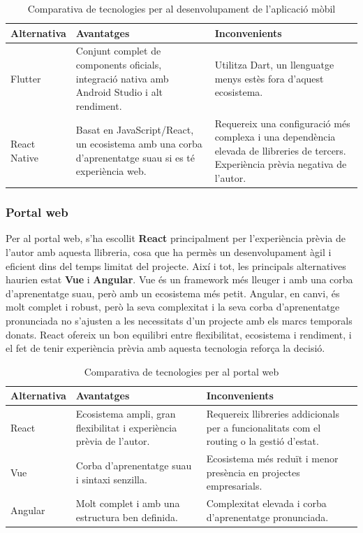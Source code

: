 \documentclass[11pt,a4paper]{report}
\begin{document}
\begin{table}[H]
\centering
\begin{tabular}{|l|p{5cm}|p{5cm}|}
\hline
\textbf{Alternativa} & \textbf{Avantatges} & \textbf{Inconvenients} \\
\hline
Flutter & Conjunt complet de components oficials, integració nativa amb Android Studio i alt rendiment. & Utilitza Dart, un llenguatge menys estès fora d'aquest ecosistema. \\
\hline
React Native & Basat en JavaScript/React, un ecosistema amb una corba d'aprenentatge suau si es té experiència web. & Requereix una configuració més complexa i una dependència elevada de llibreries de tercers. Experiència prèvia negativa de l'autor. \\
\hline
\end{tabular}
\caption{Comparativa de tecnologies per al desenvolupament de l'aplicació mòbil}
\label{tab:mobile_frameworks}
\end{table}

\subsubsection{Portal web}
Per al portal web, s'ha escollit \textbf{React} principalment per l'experiència prèvia de l'autor amb aquesta llibreria, cosa que ha permès un desenvolupament àgil i eficient dins del temps limitat del projecte. Així i tot, les principals alternatives haurien estat \textbf{Vue} i \textbf{Angular}. Vue és un framework més lleuger i amb una corba d'aprenentatge suau, però amb un ecosistema més petit. Angular, en canvi, és molt complet i robust, però la seva complexitat i la seva corba d'aprenentatge pronunciada no s'ajusten a les necessitats d'un projecte amb els marcs temporals donats. React ofereix un bon equilibri entre flexibilitat, ecosistema i rendiment, i el fet de tenir experiència prèvia amb aquesta tecnologia reforça la decisió.

\begin{table}[H]
\centering
\begin{tabular}{|l|p{5cm}|p{5cm}|}
\hline
\textbf{Alternativa} & \textbf{Avantatges} & \textbf{Inconvenients} \\
\hline
React & Ecosistema ampli, gran flexibilitat i experiència prèvia de l'autor. & Requereix llibreries addicionals per a funcionalitats com el routing o la gestió d'estat. \\
\hline
Vue & Corba d'aprenentatge suau i sintaxi senzilla. & Ecosistema més reduït i menor presència en projectes empresarials. \\
\hline
Angular & Molt complet i amb una estructura ben definida. & Complexitat elevada i corba d'aprenentatge pronunciada. \\
\hline
\end{tabular}
\caption{Comparativa de tecnologies per al portal web}
\label{tab:web_frameworks}
\end{table}
\end{document}
